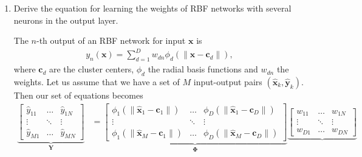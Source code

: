 \begin{enumerate}
\begin{solution}
  \end{solution}

\item Derive the equation for learning the weights of RBF networks
  with several neurons in the output layer.


  \begin{solution}

    The $n$-th output of an RBF network for input $\mathbf{x}$ is
    \begin{align*}
      y_n(\mathbf{x}) = \sum^D_{d=1} w_{dn}
      \phi_d(\|\mathbf{x}-\mathbf{c}_d\|),
    \end{align*}
    where $\mathbf{c}_d$ are the cluster centers, $\phi_d$ the radial
    basis functions and $w_{dn}$ the weights.  Let us assume that we
    have a set of $M$ input-output pairs $(\hat{\mathbf{x}}_k,
    \hat{\mathbf{y}}_k)$.  Then our set of equations becomes
    \begin{align*}
      \underbrace{
        \begin{bmatrix}
          \hat{y}_{11} & \ldots & \hat{y}_{1N}
          \\
          \vdots & \ddots & \vdots
          \\
          \hat{y}_{M1} & \ldots & \hat{y}_{MN}
        \end{bmatrix}
      }_{\mathbf{Y}}
      &=
      \underbrace{
        \begin{bmatrix}
          \phi_1(\|\hat{\mathbf{x}}_1-\mathbf{c}_1\|) & \ldots &
          \phi_D(\|\hat{\mathbf{x}}_1-\mathbf{c}_D\|) 
          \\
          \vdots & \ddots & \vdots
          \\
          \phi_1(\|\hat{\mathbf{x}}_M-\mathbf{c}_1\|) & \ldots &
          \phi_D(\|\hat{\mathbf{x}}_M-\mathbf{c}_D\|)
        \end{bmatrix}
      }_{\mathbf{\Phi}}
      \underbrace{
        \begin{bmatrix}
          w_{11} & \ldots & w_{1N}
          \\
          \vdots & \ddots & \vdots
          \\
          w_{D1} & \ldots & w_{DN}
        \end{bmatrix}
}
\end{align*}
\end{solution}
\end{enumerate}
